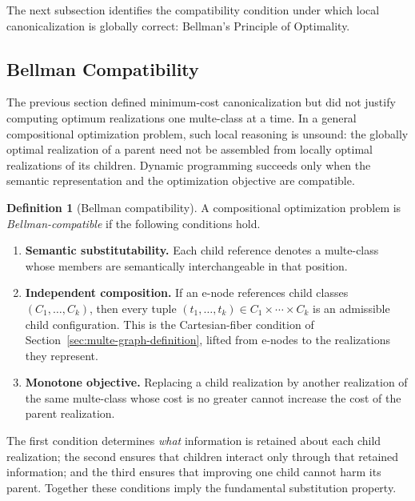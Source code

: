 \documentclass[sigconf,nonacm]{acmart}
\theoremstyle{definition}
\newtheorem{definition}{Definition}[section]
\theoremstyle{plain}
\theoremstyle{remark}
\begin{document}
The next subsection identifies the compatibility condition under which
local canonicalization is globally correct: Bellman's Principle of
Optimality.

\subsection{Bellman Compatibility}
\label{sec:bellman-compatibility}

The previous section defined minimum-cost canonicalization but did not
justify computing optimum realizations one multe-class at a time.  In a
general compositional optimization problem, such local reasoning is
unsound: the globally optimal realization of a parent need not be
assembled from locally optimal realizations of its children.  Dynamic
programming succeeds only when the semantic representation and the
optimization objective are compatible.

\begin{definition}[Bellman compatibility]
A compositional optimization problem is
\emph{Bellman-compatible} if the following conditions hold.

\begin{enumerate}

\item
\textbf{Semantic substitutability.}
Each child reference denotes a multe-class whose members are
semantically interchangeable in that position.

\item
\textbf{Independent composition.}
If an e-node references child classes \((C_1,\ldots,C_k)\), then
every tuple
\((t_1,\ldots,t_k)\in C_1\times\cdots\times C_k\)
is an admissible child configuration.  This is the Cartesian-fiber
condition of Section~\ref{sec:multe-graph-definition}, lifted from
e-nodes to the realizations they represent.

\item
\textbf{Monotone objective.}
Replacing a child realization by another realization of the same
multe-class whose cost is no greater cannot increase the cost of the
parent realization.

\end{enumerate}

\end{definition}

The first condition determines \emph{what} information is retained
about each child realization; the second ensures that children interact
only through that retained information; and the third ensures that
improving one child cannot harm its parent.  Together these conditions
imply the fundamental substitution property.
\end{document}
